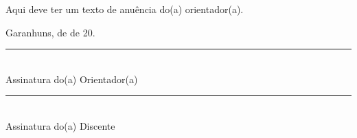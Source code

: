 Aqui deve ter um texto de anuência do(a) orientador(a).

\vspace{20pt}
\begin{flushright}
Garanhuns, \underline{\hspace{0.9cm}} de \underline{\hspace{2.5cm}} de 20\underline{\hspace{0.6cm}}.
\end{flushright}

\vspace{40pt}
\begin{flushright}
\begin{minipage}{7.5cm}
  \centering
  \rule{7.5cm}{0.4pt}\\
  Assinatura do(a) Orientador(a)
\end{minipage}
\end{flushright}

\vspace{30pt}
\begin{flushright}
\begin{minipage}{7.5cm}
  \centering
  \rule{7.5cm}{0.4pt}\\
  Assinatura do(a) Discente
\end{minipage}
\end{flushright}
